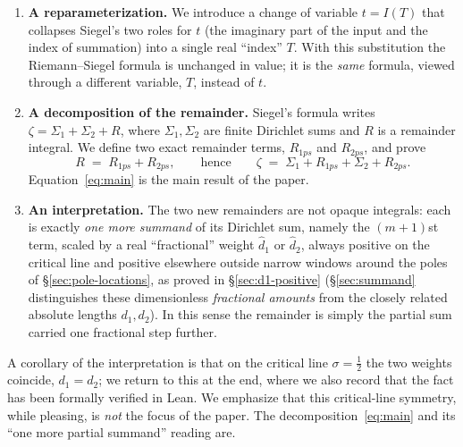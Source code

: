 \documentclass[11pt]{article}
\theoremstyle{definition}
\begin{document}
\begin{enumerate}
\item \textbf{A reparameterization.} We introduce a change of variable
$t=I(T)$ that collapses Siegel's two roles for $t$ (the imaginary part of the
input and the index of summation) into a single real ``index'' $T$. With this
substitution the Riemann--Siegel formula is unchanged in value; it is the
\emph{same} formula, viewed through a different variable, $T$, instead of $t$.

\item \textbf{A decomposition of the remainder.} Siegel's formula writes
$\zeta = \Sigma_1 + \Sigma_2 + R$, where $\Sigma_1,\Sigma_2$ are finite Dirichlet
sums and $R$ is a remainder integral. We define two exact remainder terms,
$R_{1ps}$ and $R_{2ps}$, and prove
\begin{equation}\label{eq:main}
R \;=\; R_{1ps} + R_{2ps},
\qquad\text{hence}\qquad
\zeta \;=\; \Sigma_{1} + R_{1ps} + \Sigma_{2} + R_{2ps}.
\end{equation}
Equation~\eqref{eq:main} is the main result of the paper.

\item \textbf{An interpretation.} The two new remainders are not opaque
integrals: each is exactly \emph{one more summand} of its Dirichlet sum,
namely the $(m+1)$st term, scaled by a real ``fractional'' weight
$\hat d_1$ or $\hat d_2$, always positive on the critical line and positive
elsewhere outside narrow windows around the poles of
\S\ref{sec:pole-locations}, as proved in \S\ref{sec:d1-positive}
(\S\ref{sec:summand} distinguishes these
dimensionless \emph{fractional amounts} from the closely related absolute
lengths $d_1,d_2$). In this sense the remainder is simply the partial sum
carried one fractional step further.
\end{enumerate}

A corollary of the interpretation is that on the critical line $\sigma=\tfrac12$
the two weights coincide, $d_1=d_2$; we return to this at the end, where we also
record that the fact has been formally verified in Lean. We emphasize that this
critical-line symmetry, while pleasing, is \emph{not} the focus of the paper.
The decomposition~\eqref{eq:main} and its ``one more partial summand'' reading
are.
\end{document}

